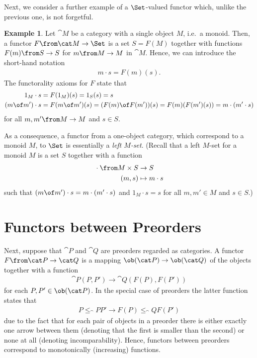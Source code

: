 \documentclass{article}
\theoremstyle{definition}
\newtheorem{example}{Example}
\begin{document}
Next, we consider a further example of a $\Set$-valued functor which, unlike the previous one, is not forgetful.
\begin{example}
  \label{ex:Mset}
  Let $\cat M$ be a category with a single object $M$, i.e.\ a monoid. Then, a functor $F\from\cat M\to\Set$ is a set $S=F(M)$ together with functions $F(m)\from S\to S$ for $m\from M\to M$ in $\cat M$. Hence, we can introduce the short-hand notation
  \begin{align*}
    m\cdot s=F(m)(s).
  \end{align*}
  The functorality axioms for $F$ state that
  \begin{align*}
    1_M\cdot s&=F(1_M)(s)=1_S(s)=s\\
    (m\of m')\cdot s&=F(m\of m')(s)=(F(m)\of F(m'))(s)=F(m)(F(m')(s))=m\cdot (m'\cdot s)
  \end{align*}
  for all $m,m'\from M\to M$ and $s\in S$.

  As a consequence, a functor from a one-object category, which correspond to a monoid $M$, to $\Set$ is essentially a \emph{left $M$-set}. (Recall that a left $M$-set for a monoid $M$ is a set $S$ together with a function
  \begin{align*}
    {} \cdot {} \from M\times S&\to S\\
    (m,s)&\mapsto m\cdot s
  \end{align*}
  such that $(m\of m')\cdot s=m\cdot (m'\cdot s)$ and $1_M\cdot s=s$ for all $m,m'\in M$ and $s\in S$.)
\end{example}

\section{Functors between Preorders}
Next, suppose that $\cat P$ and $\cat Q$ are preorders regarded as categories. A functor $F\from\cat P\to\cat Q$ is a mapping $\ob(\cat P)\to\ob(\cat Q)$ of the objects together with a function
\begin{align*}
  \cat P(P,P')\to\cat Q(F(P),F(P'))
\end{align*}
for each $P,P'\in\ob(\cat P)$. In the special case of preorders the latter function states that
\begin{align*}
  P\leq_\cat P P'\rightarrow F(P)\leq_\cat Q F(P')
\end{align*}
due to the fact that for each pair of objects in a preorder there is either exactly one arrow between them (denoting that the first is smaller than the second) or none at all (denoting incomparability). Hence, functors between preorders correspond to monotonically (increasing) functions.
\end{document}
